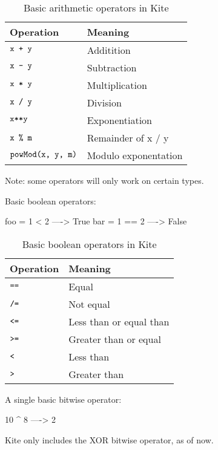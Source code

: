 \begin{table}[H]
  \centering
  \begin{tabular}{|l|l|}
    \hline
    Operation      & Meaning              \\ \hline
    $\texttt{x + y}$        & Additition           \\ \hline
    $\texttt{x - y}$        & Subtraction          \\ \hline
    $\texttt{x * y}$        & Multiplication       \\ \hline
    $\texttt{x / y}$        & Division             \\ \hline
    $\texttt{x**y}$         & Exponentiation       \\ \hline
    $\texttt{x \% m}$       & Remainder of x / y   \\ \hline
    $\texttt{powMod(x, y, m)}$ & Modulo exponentation \\ \hline
  \end{tabular}
  \label{tbl:kite-design-arith-op}
  \caption{Basic arithmetic operators in Kite}
\end{table}
Note: some operators will only work on certain types.

Basic boolean operators:
\begin{kite}
foo = 1 < 2  ----> True
bar = 1 == 2 ----> False
\end{kite}

\begin{table}[H]
  \centering
  \begin{tabular}{|l|l|}
    \hline
    Operation     & Meaning                 \\ \hline
    $\texttt{==}$          & Equal                   \\ \hline
    $\texttt{/=}$ & Not equal               \\ \hline
    $\texttt{<=}$          & Less than or equal than \\ \hline
    $\texttt{>=}$          & Greater than or equal   \\ \hline
    $\texttt{<}$           & Less than               \\ \hline
    $\texttt{>}$           & Greater than            \\ \hline
  \end{tabular}
  \label{tbl:kite-disign-bool-op}
  \caption{Basic boolean operators in Kite}
\end{table}

A single basic bitwise operator:
\begin{kite}
10 ^ 8 ----> 2
\end{kite}
Kite only includes the XOR bitwise operator, as of now.


